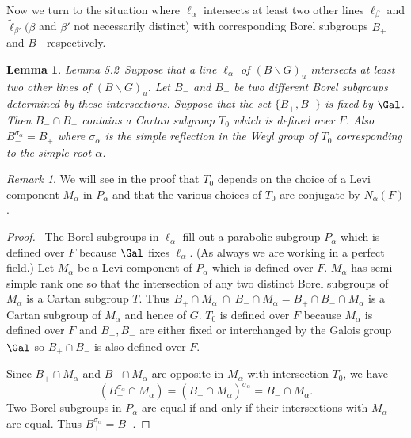 \documentclass{memo-l}
\newtheorem{lemma}[theorem]{Lemma}
\theoremstyle{definition}
\theoremstyle{remark}
\newtheorem*{remark*}{Remark} %
\numberwithin{section}{chapter}
\numberwithin{equation}{chapter}
\begin{document}
{\medskip}

   Now we turn to the situation where ${\ell}_{{\alpha}}$ intersects at
least two other lines ${\ell}_{{\beta}}$ and $\tilde{\ell} _{{\beta}'}
({\beta}$ and ${\beta}'$ not necessarily distinct) with corresponding Borel
subgroups $B_{+}$ and $B_{-}$ respectively.

\medpagebreak

\begin{lemma}{Lemma 5.2}\ Suppose that a line ${\ell}_{{\alpha}}$ of
$(B\backslash G)_{u}$ intersects at least two other lines of $(B\backslash
G)_{u}$.  Let $B_{-}$ and $B_{+}$ be two different Borel subgroups
determined by these intersections.  Suppose that the set $\{B_{+},B_{-}\}$
is fixed by $\Gal$.  Then $B_{-} \cap B_{+}$ contains a Cartan
subgroup $T_{0}$ which is defined over $F$.  Also $B_-^{\sigma_\alpha} = 
B_{+}$ where ${\sigma}_{{\alpha}}$ is the simple
reflection in the Weyl group of $T_{0}$ corresponding to the simple root
${\alpha}$.
\end{lemma}

\begin{remark*} %
We will see in the proof that $T_{0}$ depends on the
choice of a Levi component $M_{{\alpha}}$ in $P_{{\alpha}}$ and that the
various choices of $T_{0}$ are conjugate by $N_{{\alpha}}(F)$.
\end{remark*}


\begin{proof} \ The Borel subgroups in ${\ell}_{{\alpha}}$ fill out a
parabolic subgroup $P_{{\alpha}}$ which is defined over $F$ because
$\Gal$ fixes ${\ell}_{{\alpha}}$.  (As always we are working in a
perfect field.) Let $M_{{\alpha}}$ be a Levi component of $P_{{\alpha}}$
which is defined over $F$.  $M_{{\alpha}}$ has semi-simple rank one so that
the intersection of any two distinct Borel subgroups of $M_{{\alpha}}$ is a
Cartan subgroup $T$.  Thus $B_{+}\cap M_{{\alpha}} \ \cap\ 
B_{-}\cap M_{{\alpha}} = B_{+}\cap B_{-} \cap M_{{\alpha}}$ is a Cartan
subgroup of $M_{{\alpha}}$ and hence of $G$.  $T_{0}$ is defined over $F$
because $M_{{\alpha}}$ is defined over $F$ and $B_{+},B_{-}$ are either
fixed or interchanged by the Galois group $\Gal$ so
$B_{+} \cap B_{-}$ is also defined over $F$.

   Since $B_{+} \cap M_{{\alpha}}$ and $B_{-} \cap M_{{\alpha}}$ are
opposite in $M_{{\alpha}}$ with intersection $T_{0}$, we have 
$$(B_{+}^{{\sigma}_{{\alpha}}}  \cap  M_{{\alpha}}) = (B_{+}  \cap  
M_{{\alpha}})^{{\sigma}_{{\alpha}}} = B_{-}  \cap  M_{{\alpha}}.$$  Two Borel subgroups
in $P_{{\alpha}}$ are equal if and only if their intersections with
$M_{{\alpha}}$ are equal.  Thus $B_{+}^{{\sigma}_{{\alpha}}} =
B_{-}$.
\end{proof} 
\end{document}
